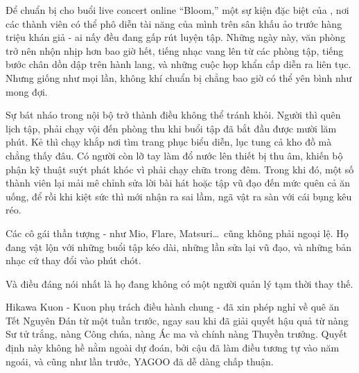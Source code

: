\documentclass[../main.tex]{subfiles}
\begin{document}
\vspace{20pt}


Để chuẩn bị cho buổi live concert online ``Bloom,'' một sự kiện đặc biệt của \hll, nơi các thành viên có thể phô diễn tài năng của mình trên sân khấu ảo trước hàng triệu khán giả - ai nấy đều đang gấp rút luyện tập. Những ngày này, văn phòng trở nên nhộn nhịp hơn bao giờ hết, tiếng nhạc vang lên từ các phòng tập, tiếng bước chân dồn dập trên hành lang, và những cuộc họp khẩn cấp diễn ra liên tục. Nhưng giống như mọi lần, không khí chuẩn bị chẳng bao giờ có thể yên bình như mong đợi.

Sự bát nháo trong nội bộ trở thành điều không thể tránh khỏi. Người thì quên lịch tập, phải chạy vội đến phòng thu khi buổi tập đã bắt đầu được mười lăm phút. Kẻ thì chạy khắp nơi tìm trang phục biểu diễn, lục tung cả kho đồ mà chẳng thấy đâu. Có người còn lỡ tay làm đổ nước lên thiết bị thu âm, khiến bộ phận kỹ thuật suýt phát khóc vì phải chạy chữa trong đêm. Trong khi đó, một số thành viên lại mải mê chỉnh sửa lời bài hát hoặc tập vũ đạo đến mức quên cả ăn uống, để rồi khi kiệt sức thì mới nhận ra sai lầm, ngã vật ra sàn với cái bụng kêu réo.

Các cô gái thần tượng - như Mio, Flare, Matsuri\dots\ cũng không phải ngoại lệ. Họ đang vật lộn với những buổi tập kéo dài, những lần sửa lại vũ đạo, và những bản nhạc cứ thay đổi vào phút chót.

Và điều đáng nói nhất là họ đang không có một người quản lý tạm thời thay thế.

Hikawa Kuon - Kuon phụ trách điều hành chung - đã xin phép nghỉ về quê ăn Tết Nguyên Đán từ một tuần trước, ngay sau khi đã giải quyết hậu quả từ nàng Sư tử trắng, nàng Công chúa, nàng Ác ma và chính nàng Thuyền trưởng. Quyết định này không hề nằm ngoài dự đoán, bởi cậu đã làm điều tương tự vào năm ngoái, và cũng như lần trước, YAGOO đã dễ dàng chấp thuận.
\end{document}
